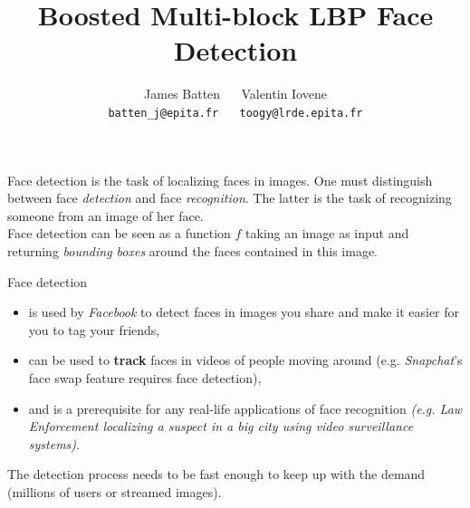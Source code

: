 \documentclass[10pt]{article}
\begin{document}

\title{
    Boosted Multi-block LBP Face Detection
}

\author{
    James Batten $\quad$ Valentin Iovene \\
    \texttt{batten\_j@epita.fr} $\quad$ \texttt{toogy@lrde.epita.fr}
}

\def\tightlist{}

\begin{titlingpage}
    \maketitle

    Face detection is the task of localizing faces in images. One must
    distinguish between face \emph{detection} and face \emph{recognition}. The
    latter is the task of recognizing someone from an image of her face. \\

    Face detection can be seen as a function $f$ taking an image as input and
    returning \emph{bounding boxes} around the faces contained in this image. \\

    \begin{center}
        
    \end{center}

    Face detection

    \begin{itemize}

        \item is used by \emph{Facebook} to detect faces in images you share and
            make it easier for you to tag your friends,

        \item can be used to \textbf{track} faces in videos of people moving
            around (e.g. \emph{Snapchat}'s face swap feature requires face
            detection),

        \item and is a prerequisite for any real-life applications of face
            recognition \emph{(e.g. Law Enforcement localizing a suspect in a
            big city using video surveillance systems)}.

    \end{itemize}

    The detection process needs to be fast enough to keep up with the demand
    (millions of users or streamed images). \\


\end{titlingpage}
\end{document}
